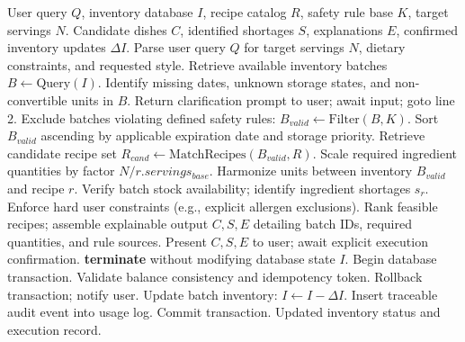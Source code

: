 \begin{algorithm}[t]
\caption{Proposed Food Guardian Workflow}
\label{alg:workflow}
\begin{algorithmic}[1]
\REQUIRE User query $Q$, inventory database $I$, recipe catalog $R$, safety rule base $K$, target servings $N$.
\ENSURE Candidate dishes $C$, identified shortages $S$, explanations $E$, confirmed inventory updates $\Delta I$.
\STATE Parse user query $Q$ for target servings $N$, dietary constraints, and requested style.
\STATE Retrieve available inventory batches $B \leftarrow \text{Query}(I)$.
\STATE Identify missing dates, unknown storage states, and non-convertible units in $B$.
    \STATE Return clarification prompt to user; await input; goto line 2.
\ENDIF
\STATE Exclude batches violating defined safety rules: $B_{valid} \leftarrow \text{Filter}(B, K)$.
\STATE Sort $B_{valid}$ ascending by applicable expiration date and storage priority.
\STATE Retrieve candidate recipe set $R_{cand} \leftarrow \text{MatchRecipes}(B_{valid}, R)$.
    \STATE Scale required ingredient quantities by factor $N / r.servings_{base}$.
    \STATE Harmonize units between inventory $B_{valid}$ and recipe $r$.
    \STATE Verify batch stock availability; identify ingredient shortages $s_r$.
    \STATE Enforce hard user constraints (e.g., explicit allergen exclusions).
\ENDFOR
\STATE Rank feasible recipes; assemble explainable output $C, S, E$ detailing batch IDs, required quantities, and rule sources.
\STATE Present $C, S, E$ to user; await explicit execution confirmation.
    \STATE \textbf{terminate} without modifying database state $I$.
\ENDIF
\STATE Begin database transaction.
\STATE Validate balance consistency and idempotency token.
    \STATE Rollback transaction; notify user.
\ELSE
    \STATE Update batch inventory: $I \leftarrow I - \Delta I$.
    \STATE Insert traceable audit event into usage log.
    \STATE Commit transaction.
\ENDIF
\RETURN Updated inventory status and execution record.
\end{algorithmic}
\end{algorithm}

